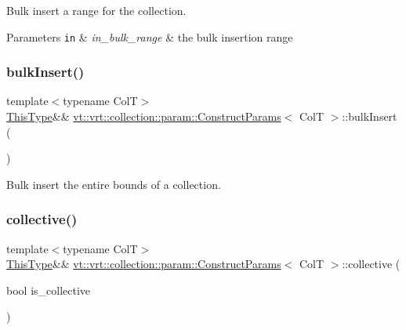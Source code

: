Bulk insert a range for the collection. 


\begin{DoxyParams}[1]{Parameters}
\mbox{\tt in}  & {\em in\+\_\+bulk\+\_\+range} & the bulk insertion range \\
\hline
\end{DoxyParams}
\mbox{\label{structvt_1_1vrt_1_1collection_1_1param_1_1_construct_params_abf7e7faa810ea7d6c3a3abf0ad732a01}} 
\subsubsection{\texorpdfstring{bulk\+Insert()}{bulkInsert()}\hspace{0.1cm}{\footnotesize\ttfamily [2/2]}}
{\footnotesize\ttfamily template$<$typename ColT$>$ \\
\hyperlink{structvt_1_1vrt_1_1collection_1_1param_1_1_construct_params_a13d4910c0f6825c7b0ddfebce5288bea}{This\+Type}\&\& \hyperlink{structvt_1_1vrt_1_1collection_1_1param_1_1_construct_params}{vt\+::vrt\+::collection\+::param\+::\+Construct\+Params}$<$ ColT $>$\+::bulk\+Insert (\begin{DoxyParamCaption}{ }\end{DoxyParamCaption})\hspace{0.3cm}{\ttfamily [inline]}}



Bulk insert the entire bounds of a collection. 

\mbox{\label{structvt_1_1vrt_1_1collection_1_1param_1_1_construct_params_aded96b7d8b93f3ae8b91c419cbce6ddd}} 
\subsubsection{\texorpdfstring{collective()}{collective()}}
{\footnotesize\ttfamily template$<$typename ColT$>$ \\
\hyperlink{structvt_1_1vrt_1_1collection_1_1param_1_1_construct_params_a13d4910c0f6825c7b0ddfebce5288bea}{This\+Type}\&\& \hyperlink{structvt_1_1vrt_1_1collection_1_1param_1_1_construct_params}{vt\+::vrt\+::collection\+::param\+::\+Construct\+Params}$<$ ColT $>$\+::collective (\begin{DoxyParamCaption}\item[{bool}]{is\+\_\+collective }\end{DoxyParamCaption})\hspace{0.3cm}{\ttfamily [inline]}}



